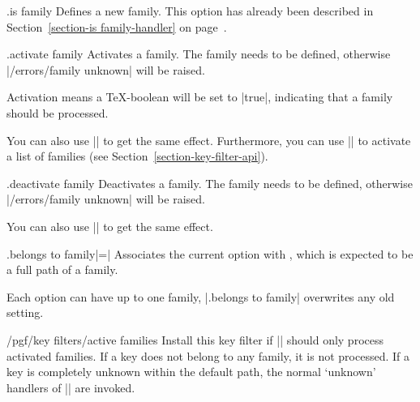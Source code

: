 \begin{handler}{{.is family}}
    Defines a new family. This option has already been described in
    Section~\ref{section-is family-handler} on page~\pageref{section-is
    family-handler}.
\end{handler}

\begin{handler}{{.activate family}}
    Activates a family. The family needs to be defined, otherwise
    |/errors/family unknown| will be raised.

    Activation means a \TeX-boolean will be set to |true|, indicating that a
    family should be processed.

    You can also use |\pgfkeysactivatefamily| to get the same
    effect. Furthermore, you can use |\pgfkeysactivatefamilies| to activate a list of families
    (see Section~\ref{section-key-filter-api}).
\end{handler}

\begin{handler}{{.deactivate family}}
    Deactivates a family. The family needs to be defined, otherwise
    |/errors/family unknown| will be raised.

    You can also use |\pgfkeysdeactivatefamily| to get the same
    effect.
\end{handler}

\begin{handler}{{.belongs to family}|=|}
    Associates the current option with , which is expected to
    be a full path of a family.
\begin{codeexample}
\end{codeexample}
    Each option can have up to one family, |.belongs to family| overwrites any
    old setting.
\end{handler}

\begin{key}{/pgf/key filters/active families}
    Install this key filter if |\pgfkeysfiltered| should only process activated
    families. If a key does not belong to any family, it is not processed. If a
    key is completely unknown within the default path, the normal `unknown'
    handlers of |\pgfkeys| are invoked.
\end{key}


